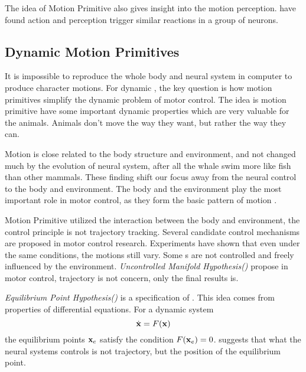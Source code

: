 The idea of Motion Primitive also gives insight into the motion perception.
\citet{gallese1996action} have found action and perception trigger similar reactions in a group of neurons.





\subsection{Dynamic Motion Primitives}
It is impossible to reproduce the whole body and neural system in computer to produce character motions.
For dynamic \cms, the key question is how motion primitives simplify the dynamic problem of motor control.
The idea is motion primitive have some important dynamic properties which are very valuable for the animals.
Animals don’t move the way they want, but rather the way they can. 

Motion is close related to the body structure and environment,
and not changed much by the evolution of neural system, after all the whale swim more like fish than other mammals.
These finding shift our focus away from the neural control to the body and environment.
The body and the environment play the most important role in motor control, as they form the basic pattern of motion \citep{nishikawa2007neuromechanics}.


Motion Primitive utilized the interaction between the body and environment, the control principle is not trajectory tracking.
Several candidate control mechanisms are proposed in motor control research.
Experiments have shown that even under the same conditions, the motions still vary. 
Some \dof s are not controlled and freely influenced by the environment. 
\emph{Uncontrolled Manifold Hypothesis(\umh)}\citep{latash2008neurophysiological} propose in motor control, trajectory is not concern, only the final results is.


\emph{Equilibrium Point Hypothesis(\eph)}\citep{Feldman1986} is a specification of \umh.
This idea comes from properties of differential equations. 
For a dynamic system
\[
\dot{\mathbf{x}}=F(\mathbf{x})
\]
the equilibrium points $\mathbf{x}_{e}$ satisfy the condition $F(\mathbf{x}_{e})=0$.
\eph suggests that what the neural systems controls is not trajectory, but the position of the equilibrium point.



